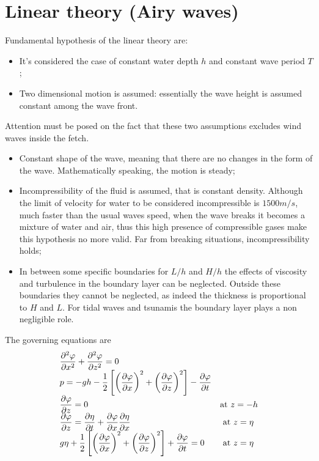 \section{Linear theory (Airy waves)}\label{Airy}
Fundamental hypothesis of the linear theory are:
\begin{itemize}
\item It's considered the case of constant water depth $h$ and constant wave period $T$; 
\item Two dimensional motion is assumed: essentially the wave height is assumed constant among the wave front.
\end{itemize}
Attention must be posed on the fact that these two assumptions excludes wind waves inside the fetch.
\begin{itemize}
\item Constant shape of the wave, meaning that there are no changes in the form of the wave. Mathematically speaking, the motion is steady;
\item Incompressibility of the fluid is assumed, that is constant density. Although the limit of velocity for water to be considered incompressible is $1500m/s$, much faster than the usual waves speed, when the wave breaks it becomes a mixture of water and air, thus this high presence of compressible gases make this hypothesis no more valid. Far from breaking situations, incompressibility holds;
\item In between some specific boundaries for $L/h$ and $H/h$ the effects of viscosity and turbulence in the boundary layer can be neglected. Outside these boundaries they cannot be neglected, as indeed the thickness is proportional to $H$ and $L$. For tidal waves and tsunamis the boundary layer plays a non negligible role.
\end{itemize}
The governing equations are
\renewcommand{\arraystretch}{2.5}
\begin{equation*}
\begin{array}{ll}
\dfrac{\partial^{2} \varphi}{\partial x^{2}}+\dfrac{\partial^{2}\varphi}{\partial z^{2}}=0 & \\
p=-gh - \dfrac{1}{2}\left[ \left( \dfrac{\partial\varphi}{\partial x} \right)^{2}+\left( \dfrac{\partial\varphi}{\partial z} \right)^{2} \right] -\dfrac{\partial \varphi}{\partial t} & \\
\dfrac{\partial\varphi}{\partial z}=0 & \text{at } z=-h\\
\dfrac{\partial\varphi}{\partial z}=\dfrac{\partial\eta}{\partial t}+\dfrac{\partial\varphi}{\partial x}\dfrac{\partial\eta}{\partial x}   \qquad  & \text{ at } z=\eta \\
g\eta + \dfrac{1}{2}\left[ \left( \dfrac{\partial\varphi}{\partial x} \right)^{2}+\left( \dfrac{\partial\varphi}{\partial z} \right)^{2} \right] +\dfrac{\partial \varphi}{\partial t}=0 & \text{ at } z=\eta
\end{array}
\end{equation*}
